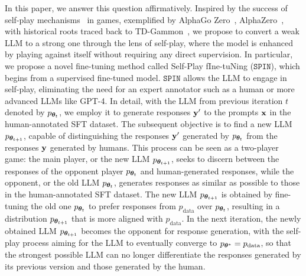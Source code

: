 \documentclass{article}
\newcommand{\method}{\texttt{SPIN}}
\begin{document}
In this paper, we answer this question affirmatively. Inspired by the success of self-play mechanisms~\citep{samuel2000some} in games, exemplified by AlphaGo Zero~\citep{silver2017mastering}, AlphaZero~\citep{silver2017masteringchess}, with historical roots traced back to TD-Gammon~\citep{tesauro1995temporal}, we propose to convert a weak LLM to a strong one through the lens of self-play, where the model is enhanced by playing against itself without requiring any direct supervision. In particular, we propose a novel fine-tuning method called Self-Play fIne-tuNing ($\method$), which begins from a supervised fine-tuned model. 
$\method$ allows the LLM to engage in self-play, eliminating the need for an expert annotator such as a human or more advanced LLMs like GPT-4.
In detail, with the LLM from previous iteration $t$ denoted by $p_{\bm{\theta}_t}$, we employ it to generate responses $\mathbf{y}'$ to the prompts $\mathbf{x}$ in the human-annotated SFT dataset. 
The subsequent objective is to find a new LLM $p_{\bm{\theta}_{t+1}}$, capable of distinguishing the responses $\mathbf{y}'$ generated by $p_{\bm{\theta}_t}$ from the responses $\mathbf{y}$ generated by humans. 
This process can be seen as a two-player game: the main player, or the new LLM $p_{\bm{\theta}_{t+1}}$, seeks to discern between the responses of the opponent player $p_{\bm{\theta}_t}$ and human-generated responses, 
while the opponent, 
or the old LLM $p_{\bm{\theta}_t}$, generates responses as similar as possible to those in the human-annotated SFT dataset.
The new LLM $p_{\bm{\theta}_{t+1}}$ is obtained by fine-tuning the old one $p_{\bm{\theta}_t}$ to prefer responses from $p_{\mathrm{data}}$ over $p_{\bm{\theta}_t}$, resulting in a distribution $p_{\bm{\theta}_{t+1}}$ that is more aligned with $p_{\mathrm{data}}$.
In the next iteration, the newly obtained LLM $p_{\bm{\theta}_{t+1}}$ becomes the opponent for response generation, with the self-play process aiming for the LLM to eventually converge to $p_{\bm{\theta}^*}= p_{\mathrm{data}}$, so that the strongest possible LLM can no longer differentiate the responses generated by its previous version and those generated by the human. 
\end{document}
